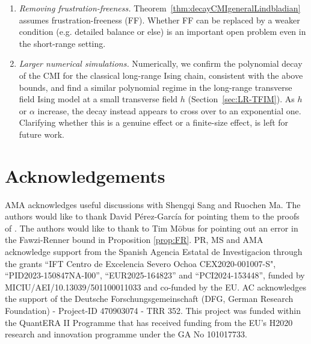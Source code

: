 \documentclass[11pt]{article}
\numberwithin{equation}{section}
\numberwithin{figure}{section}
\numberwithin{table}{section}
\theoremstyle{definition}
\theoremstyle{plain}
\theoremstyle{remark}
\begin{document}
\begin{enumerate}
 On the other hand, Theorem \ref{thm:decayCMIgeneralLindbladian} shows that the CMI decays unconditionally in the short-range case (i.e. whenever $F$ decays exponentially), and Corollary \ref{cor:decayCMILongRange} extends this to long-range Lindbladians whenever $\alpha>\alpha^*:=n(\lambda+v)D/\lambda$

Hence, for $\alpha>\max \{\alpha^*,3D-1\}$ (and unconditionally in the short-range case) rapid mixing forbids SW-SSB, since neither the ordinary correlations nor the CMI survive at long distance. For $\alpha\leq \alpha^*$, it remains open whether the CMI could fail to decay while the ordinary correlations still do, which would allow SW-SSB to occur even under rapid mixing.


\item \emph{Removing frustration-freeness.}
Theorem~\ref{thm:decayCMIgeneralLindbladian} assumes frustration-freeness (FF).
Whether FF can be replaced by a weaker condition (e.g. detailed balance
or else) is an important open problem even in the short-range setting.

\item \textit{Larger numerical simulations.} Numerically, we confirm the polynomial decay of the CMI for the classical long-range Ising chain, consistent with the above bounds, and find a similar polynomial regime in the long-range transverse field Ising model at a small transverse field $h$ (Section~\ref{sec:LR-TFIM}). As $h$ or $\alpha$ increase, the decay instead appears to cross over to an exponential one. Clarifying whether this is a genuine effect or a finite-size effect, is left for future work.

\end{enumerate}

\section{Acknowledgements}
AMA acknowledges useful discussions with Shengqi Sang and Ruochen Ma. The authors would like to thank David P\'erez-Garc\'ia for pointing them to the proofs of \cite{brandao_area_2015}. The authors would like to thank to Tim Möbus for pointing out an error in the Fawzi-Renner bound in Proposition \ref{prop:FR}. PR, MS and AMA acknowledge support from the Spanish Agencia Estatal de Investigacion through the grants ``IFT Centro de Excelencia Severo Ochoa CEX2020-001007-S", ``PID2023-150847NA-I00'', ``EUR2025-164823'' and  ``PCI2024-153448'', funded by MICIU/AEI/10.13039/501100011033 and co-funded by the EU. AC acknowledges the support of the Deutsche Forschungsgemeinschaft (DFG, German Research Foundation) - Project-ID 470903074 - TRR 352.  This
project was funded within the QuantERA II Programme that has received funding from the EU’s H2020 research and innovation programme under the GA No 101017733.
\end{document}

